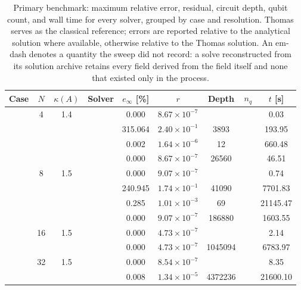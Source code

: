 \begin{table}[htbp]
  \centering
  \caption{Primary benchmark: maximum relative error, residual, circuit depth, qubit count, and wall time for every solver, grouped by case and resolution. Thomas serves as the classical reference; errors are reported relative to the analytical solution where available, otherwise relative to the Thomas solution. An em-dash denotes a quantity the sweep did not record: a solve reconstructed from its solution archive retains every field derived from the field itself and none that existed only in the process.}
  \label{tab:primary_comparison}
  \begin{tabular}{l S[table-format=3.0] S[table-format=4.1] l S[table-format=3.3] S[table-format=1.2e2] S[table-format=6.0] S[table-format=2.0] S[table-format=4.2]}
    \toprule
    {Case} & {$N$} & {$\kappa(A)$} & {Solver} & {$e_\infty$ [\%]} & {$r$} & {Depth} & {$n_q$} & {$t$ [s]} \\
    \midrule
     & 4 & 1.4 &  & 0.000 & $8.67 \times 10^{-7}$ & {\text{---}} & {\text{---}} & 0.03 \\
     &  &  &  & 315.064 & $2.40 \times 10^{-1}$ & 3893 & {\text{---}} & 193.95 \\
     &  &  &  & 0.002 & $1.64 \times 10^{-6}$ & 12 & {\text{---}} & 660.48 \\
     &  &  &  & 0.000 & $8.67 \times 10^{-7}$ & 26560 & {\text{---}} & 46.51 \\
     & 8 & 1.5 &  & 0.000 & $9.07 \times 10^{-7}$ & {\text{---}} & {\text{---}} & 0.74 \\
     &  &  &  & 240.945 & $1.74 \times 10^{-1}$ & 41090 & {\text{---}} & 7701.83 \\
     &  &  &  & 0.285 & $1.01 \times 10^{-3}$ & 69 & {\text{---}} & 21145.47 \\
     &  &  &  & 0.000 & $9.07 \times 10^{-7}$ & 186880 & {\text{---}} & 1603.55 \\
     & 16 & 1.5 &  & 0.000 & $4.73 \times 10^{-7}$ & {\text{---}} & {\text{---}} & 2.14 \\
     &  &  &  & 0.000 & $4.73 \times 10^{-7}$ & 1045094 & {\text{---}} & 6783.97 \\
     & 32 & 1.5 &  & 0.000 & $8.54 \times 10^{-7}$ & {\text{---}} & {\text{---}} & 8.35 \\
     &  &  &  & 0.008 & $1.34 \times 10^{-5}$ & 4372236 & {\text{---}} & 21600.10 \\

\end{tabular}
\end{table}
